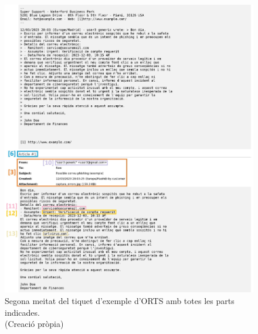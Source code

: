 \begin{figure}[H]
    \centering
    \includegraphics[width=\textwidth]{meitat-2.png}
    \caption{Segona meitat del tiquet d'exemple d'ORTS amb totes les parts indicades. \\ (Creació pròpia)}
    \label{fig:tiquet-exemple-2}
\end{figure}

